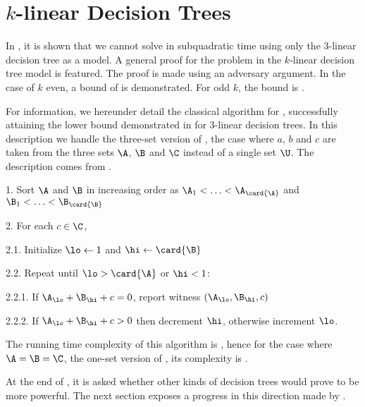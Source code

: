 \section{$k$-linear Decision Trees}

In \citet*{erickson:1999}, it is shown that we cannot solve \threeSUM in
subquadratic time using only the $3$-linear decision tree as a model. A
general proof for the \kLDT problem in the $k$-linear decision tree model
is featured. The proof is made using an adversary argument. In the case of $k$
even, a bound of  is demonstrated. For odd $k$, the
bound is .

For information, we hereunder detail the classical  algorithm for
\threeSUM, successfully attaining the lower bound demonstrated in
\cite{erickson:1999} for $3$-linear decision trees. In this description we
handle the three-set version of \threeSUM, \ie the case where $a$, $b$ and $c$
are taken from the three sets $\A$, $\B$ and $\C$ instead of a single set $\U$.
The description comes from \citet*{gronlund:2014}.


\begin{algorithm}
\item[1.] Sort $\A$ and $\B$ in increasing order as $\A_1 < \ldots <
\A_{\card{\A}}$ and $\B_1 < \ldots < \B_{\card{\B}}$
\item[2.] For each $c \in \C$,
\item[2.1.] Initialize $\lo \gets 1$ and $\hi \gets \card{\B}$
\item[2.2.] Repeat until $\lo > \card{\A}$ or $\hi < 1$:
\item[2.2.1.] If $\A_{\lo} + \B_{\hi} + c = 0$, report witness $(\A_{\lo},
\B_{\hi}, c)$
\item[2.2.2.] If $\A_{\lo} + \B_{\hi} + c > 0$ then decrement $\hi$, otherwise
increment $\lo$.
\end{algorithm}


The running time complexity of this algorithm is
\BigO{\card{\C}(\card{\A}+\card{\B})}, hence for the case where
$\A = \B = \C$, \ie the one-set version of \threeSUM, its complexity is
.

At the end of \cite{erickson:1999}, it is asked whether other kinds of
decision trees would prove to be more powerful. The next section exposes a
progress in this direction made by \citet*{ailon:2005}.
